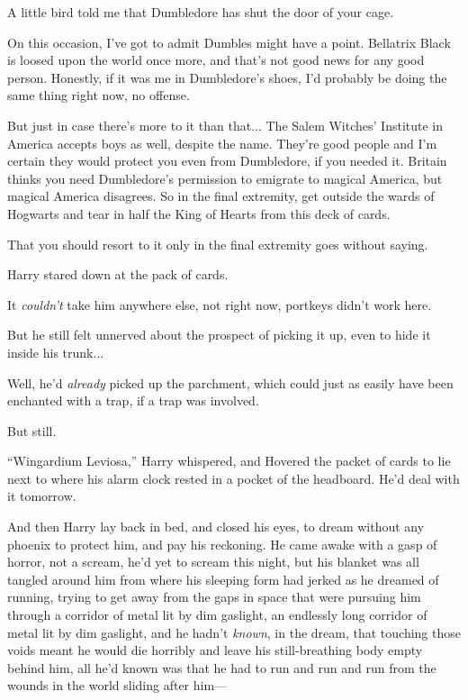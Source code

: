 \begin{writtenNote}
A little bird told me that Dumbledore has shut the door of your cage.

On this occasion, I’ve got to admit Dumbles might have a point. Bellatrix Black is loosed upon the world once more, and that’s not good news for any good person. Honestly, if it was me in Dumbledore’s shoes, I’d probably be doing the same thing right now, no offense.

But just in case there’s more to it than that... The Salem Witches’ Institute in America accepts boys as well, despite the name. They’re good people and I’m certain they would protect you even from Dumbledore, if you needed it. Britain thinks you need Dumbledore’s permission to emigrate to magical America, but magical America disagrees. So in the final extremity, get outside the wards of Hogwarts and tear in half the King of Hearts from this deck of cards.

That you should resort to it only in the final extremity goes without saying.

\end{writtenNote}

Harry stared down at the pack of cards.

It \emph{couldn’t} take him anywhere else, not right now, portkeys didn’t work here.

But he still felt unnerved about the prospect of picking it up, even to hide it inside his trunk...

Well, he’d \emph{already} picked up the parchment, which could just as easily have been enchanted with a trap, if a trap was involved.

But still.

“Wingardium Leviosa,” Harry whispered, and Hovered the packet of cards to lie next to where his alarm clock rested in a pocket of the headboard. He’d deal with it tomorrow.

And then Harry lay back in bed, and closed his eyes, to dream without any phoenix to protect him, and pay his reckoning.
\sbreak
He came awake with a gasp of horror, not a scream, he’d yet to scream this night, but his blanket was all tangled around him from where his sleeping form had jerked as he dreamed of running, trying to get away from the gaps in space that were pursuing him through a corridor of metal lit by dim gaslight, an endlessly long corridor of metal lit by dim gaslight, and he hadn’t \emph{known}, in the dream, that touching those voids meant he would die horribly and leave his still-breathing body empty behind him, all he’d known was that he had to run and run and run from the wounds in the world sliding after him—

